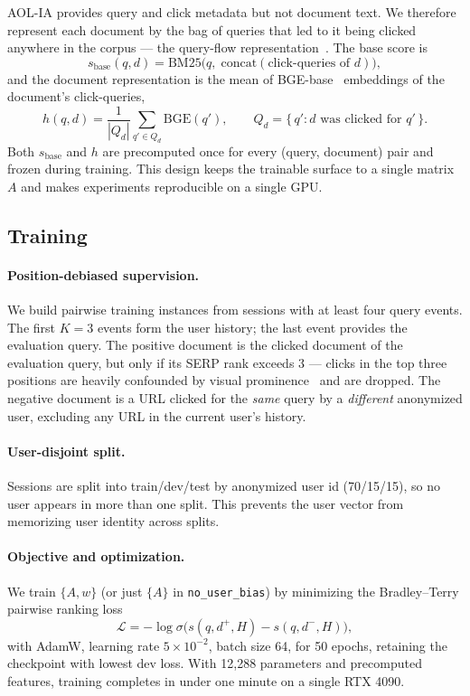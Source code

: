 AOL-IA provides query and click metadata but not document text. We therefore represent each document by the bag of queries that led to it being clicked anywhere in the corpus --- the query-flow representation~\cite{craswell2007click}. The base score is
\begin{equation}
s_{\mathrm{base}}(q,d) = \mathrm{BM25}\bigl(q,\; \mathrm{concat}(\text{click-queries of } d)\bigr),
\end{equation}
and the document representation is the mean of BGE-base~\cite{xiao2023bge} embeddings of the document's click-queries,
\begin{equation}
h(q,d) = \frac{1}{|Q_d|}\sum_{q' \in Q_d} \mathrm{BGE}(q'), \qquad Q_d = \{\,q' : d \text{ was clicked for } q'\,\}.
\end{equation}
Both $s_{\mathrm{base}}$ and $h$ are precomputed once for every (query, document) pair and frozen during training. This design keeps the trainable surface to a single matrix $A$ and makes experiments reproducible on a single GPU.

\subsection{Training}

\paragraph{Position-debiased supervision.}
We build pairwise training instances from sessions with at least four query events. The first $K=3$ events form the user history; the last event provides the evaluation query. The positive document is the clicked document of the evaluation query, but only if its SERP rank exceeds 3 --- clicks in the top three positions are heavily confounded by visual prominence~\cite{craswell2008experimental,joachims2007evaluating} and are dropped. The negative document is a URL clicked for the \emph{same} query by a \emph{different} anonymized user, excluding any URL in the current user's history.

\paragraph{User-disjoint split.}
Sessions are split into train/dev/test by anonymized user id (70/15/15), so no user appears in more than one split. This prevents the user vector from memorizing user identity across splits.

\paragraph{Objective and optimization.}
We train $\{A, w\}$ (or just $\{A\}$ in \texttt{no\_user\_bias}) by minimizing the Bradley--Terry pairwise ranking loss
\begin{equation}
\mathcal{L} = -\log\sigma\bigl(s(q,d^{+},H) - s(q,d^{-},H)\bigr),
\end{equation}
with AdamW, learning rate $5 \times 10^{-2}$, batch size 64, for 50 epochs, retaining the checkpoint with lowest dev loss. With 12{,}288 parameters and precomputed features, training completes in under one minute on a single RTX 4090.
